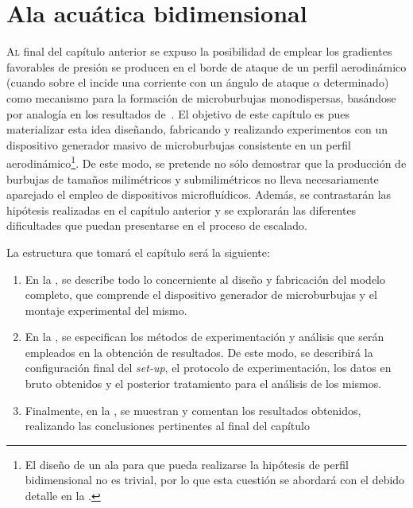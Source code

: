 \chapter{Ala acuática bidimensional}
\pagestyle{esitscCD}
\epigraph{ }{}

\lettrine[lraise=-0.1, lines=2, loversize=0.25]{A}l final del capítulo anterior se expuso la posibilidad de emplear los gradientes favorables de presión se producen en el borde de ataque de un perfil aerodinámico (cuando sobre el incide una corriente con un ángulo de ataque $\alpha$ determinado) como mecanismo para la formación de microburbujas monodispersas, basándose por analogía en los resultados de~\cite{Evangelio2015b}. El objetivo de este capítulo es pues materializar esta idea diseñando, fabricando y realizando experimentos con un dispositivo generador masivo de microburbujas consistente en un perfil aerodinámico\footnote{El diseño de un ala para que pueda realizarse la hipótesis de perfil bidimensional no es trivial, por lo que esta cuestión se abordará con el debido detalle en la .}. De este modo, se pretende no sólo demostrar que la producción de burbujas de tamaños milimétricos y submilimétricos no lleva necesariamente aparejado el empleo de dispositivos microfluídicos. Además, se contrastarán las hipótesis realizadas en el capítulo anterior y se explorarán las diferentes dificultades que puedan presentarse en el proceso de escalado. 

La estructura que tomará el capítulo será la siguiente: 
\begin{enumerate}
\item En la , se describe todo lo concerniente al diseño y fabricación del modelo completo, que comprende el dispositivo generador de microburbujas y el montaje experimental del mismo. 
\item En la , se especifican los métodos de experimentación y análisis que serán empleados en la obtención de resultados. De este modo, se describirá la configuración final del \textit{set-up}, el protocolo de experimentación, los datos en bruto obtenidos y el posterior tratamiento para el análisis de los mismos.
\item Finalmente, en  la , se muestran y comentan los resultados obtenidos, realizando las conclusiones pertinentes al final del capítulo
\end{enumerate}

